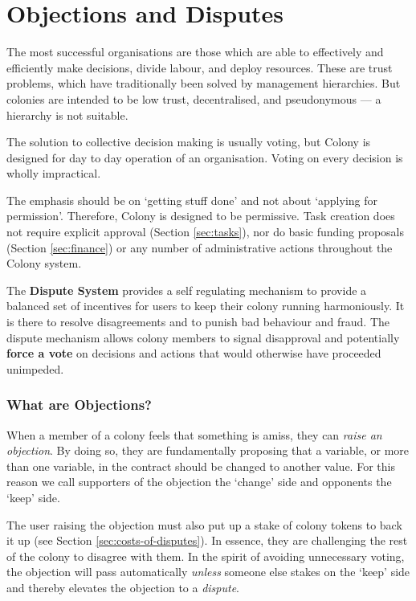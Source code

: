 \section{Objections and Disputes}\label{sec:objections-and-disputes}\label{sec:disputes}
The most successful organisations are those which are able to effectively and efficiently make decisions, divide labour, and deploy resources. These are trust problems, which have traditionally been solved by management hierarchies. But colonies are intended to be low trust, decentralised, and pseudonymous --- a hierarchy is not suitable. 

The solution to collective decision making is usually voting, but Colony is designed for day to day operation of an organisation. Voting on every decision is wholly impractical.

The emphasis should be on `getting stuff done' and not about `applying for permission'. Therefore, Colony is designed to be permissive. Task creation does not require explicit approval (Section \ref{sec:tasks}), nor do basic funding proposals (Section \ref{sec:finance}) or any number of administrative actions throughout the Colony system.

The \textbf{Dispute System} provides a self regulating mechanism to provide a balanced set of incentives for users to keep their colony running harmoniously. It is there to resolve disagreements and to punish bad behaviour and fraud. The dispute mechanism allows colony members to signal disapproval and potentially \textbf{force a vote} on decisions and actions that would otherwise have proceeded unimpeded.

\subsubsection*{What are Objections?}
When a member of a colony feels that something is amiss, they can \emph{raise an objection}. By doing so, they are fundamentally proposing that a variable, or more than one variable, in the contract should be changed to another value. For this reason we call supporters of the objection the `change' side and opponents the `keep' side.

The user raising the objection must also put up a stake of colony tokens to back it up (see Section \ref{sec:costs-of-disputes}). In essence, they are challenging the rest of the colony to disagree with them. In the spirit of avoiding unnecessary voting, the objection will pass automatically \emph{unless} someone else stakes on the `keep' side and thereby elevates the objection to a \emph{dispute}.


